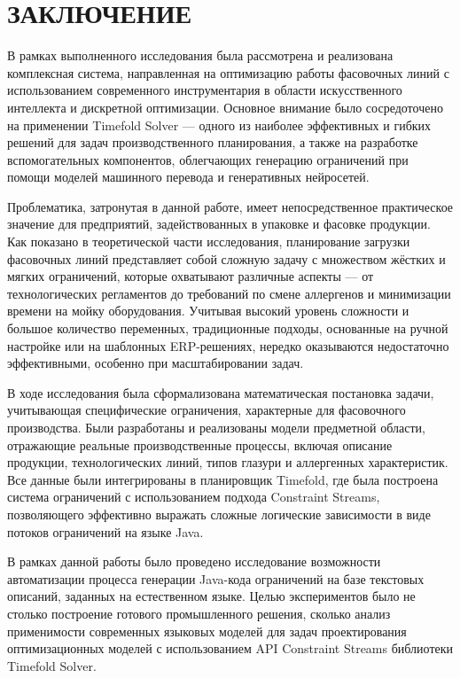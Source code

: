 \chapter*{ЗАКЛЮЧЕНИЕ}

В рамках выполненного исследования была рассмотрена и реализована комплексная система, направленная на оптимизацию работы фасовочных линий с использованием современного инструментария в области искусственного интеллекта и дискретной оптимизации. Основное внимание было сосредоточено на применении Timefold Solver — одного из наиболее эффективных и гибких решений для задач производственного планирования, а также на разработке вспомогательных компонентов, облегчающих генерацию ограничений при помощи моделей машинного перевода и генеративных нейросетей.

Проблематика, затронутая в данной работе, имеет непосредственное практическое значение для предприятий, задействованных в упаковке и фасовке продукции. Как показано в теоретической части исследования, планирование загрузки фасовочных линий представляет собой сложную задачу с множеством жёстких и мягких ограничений, которые охватывают различные аспекты — от технологических регламентов до требований по смене аллергенов и минимизации времени на мойку оборудования. Учитывая высокий уровень сложности и большое количество переменных, традиционные подходы, основанные на ручной настройке или на шаблонных ERP-решениях, нередко оказываются недостаточно эффективными, особенно при масштабировании задач.

В ходе исследования была сформализована математическая постановка задачи, учитывающая специфические ограничения, характерные для фасовочного производства. Были разработаны и реализованы модели предметной области, отражающие реальные производственные процессы, включая описание продукции, технологических линий, типов глазури и аллергенных характеристик. Все данные были интегрированы в планировщик Timefold, где была построена система ограничений с использованием подхода Constraint Streams, позволяющего эффективно выражать сложные логические зависимости в виде потоков ограничений на языке Java.

В рамках данной работы было проведено исследование возможности автоматизации процесса генерации Java-кода ограничений на базе текстовых описаний, заданных на естественном языке. Целью экспериментов было не столько построение готового промышленного решения, сколько анализ применимости современных языковых моделей для задач проектирования оптимизационных моделей с использованием API Constraint Streams библиотеки Timefold Solver.

